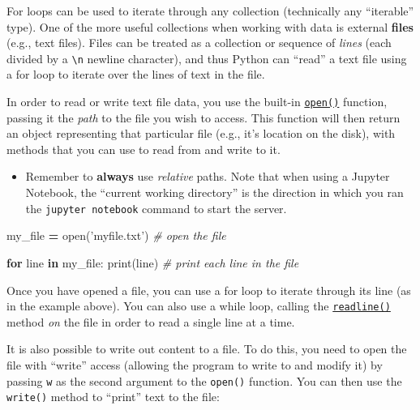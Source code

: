 \documentclass[]{book}
\newenvironment{Shaded}{\begin{snugshade}}{\end{snugshade}}
\newcommand{\KeywordTok}[1]{\textcolor[rgb]{0.13,0.29,0.53}{\textbf{#1}}}
\newcommand{\StringTok}[1]{\textcolor[rgb]{0.31,0.60,0.02}{#1}}
\newcommand{\CommentTok}[1]{\textcolor[rgb]{0.56,0.35,0.01}{\textit{#1}}}
\newcommand{\ControlFlowTok}[1]{\textcolor[rgb]{0.13,0.29,0.53}{\textbf{#1}}}
\newcommand{\OperatorTok}[1]{\textcolor[rgb]{0.81,0.36,0.00}{\textbf{#1}}}
\newcommand{\BuiltInTok}[1]{#1}
\newcommand{\NormalTok}[1]{#1}
\providecommand{\tightlist}{%
  \setlength{\itemsep}{0pt}\setlength{\parskip}{0pt}}
\begin{document}
For loops can be used to iterate through any collection (technically any
``iterable'' type). One of the more useful collections when working with
data is external \textbf{files} (e.g., text files). Files can be treated
as a collection or sequence of \emph{lines} (each divided by a
\texttt{\textbackslash{}n} newline character), and thus Python can
``read'' a text file using a for loop to iterate over the lines of text
in the file.

In order to read or write text file data, you use the built-in
\href{https://docs.python.org/3/library/functions.html\#open}{\texttt{open()}}
function, passing it the \emph{path} to the file you wish to access.
This function will then return an object representing that particular
file (e.g., it's location on the disk), with methods that you can use to
read from and write to it.

\begin{itemize}
\tightlist
\item
  Remember to \textbf{always} use \emph{relative} paths. Note that when
  using a Jupyter Notebook, the ``current working directory'' is the
  direction in which you ran the \texttt{jupyter\ notebook} command to
  start the server.
\end{itemize}

\begin{Shaded}
\begin{Highlighting}[]
\NormalTok{my_file }\OperatorTok{=} \BuiltInTok{open}\NormalTok{(}\StringTok{'myfile.txt'}\NormalTok{)  }\CommentTok{# open the file}

\ControlFlowTok{for}\NormalTok{ line }\KeywordTok{in}\NormalTok{ my_file:}
    \BuiltInTok{print}\NormalTok{(line)  }\CommentTok{# print each line in the file}
\end{Highlighting}
\end{Shaded}

Once you have opened a file, you can use a for loop to iterate through
its line (as in the example above). You can also use a while loop,
calling the
\href{https://docs.python.org/3.3/tutorial/inputoutput.html\#methods-of-file-objects}{\texttt{readline()}}
method \emph{on} the file in order to read a single line at a time.

It is also possible to write out content to a file. To do this, you need
to open the file with ``write'' access (allowing the program to write to
and modify it) by passing \texttt{w} as the second argument to the
\texttt{open()} function. You can then use the \texttt{write()} method
to ``print'' text to the file:
\end{document}
